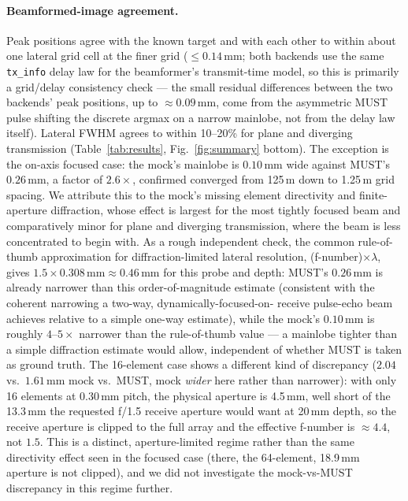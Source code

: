 \documentclass[11pt]{article}
\newcommand{\code}[1]{\texttt{#1}}
\newcommand{\must}{MUST}
\begin{document}
\paragraph{Beamformed-image agreement.} Peak positions agree with the known
target and with each other to within about one lateral grid cell at the
finer grid ($\leq 0.14$\,mm; both backends use the same \code{tx\_info}
delay law for the beamformer's transmit-time model, so this is primarily a
grid/delay consistency check --- the small residual differences between the
two backends' peak positions, up to $\approx 0.09$\,mm, come from the
asymmetric \must{} pulse shifting the discrete argmax on a narrow mainlobe,
not from the delay law itself). Lateral FWHM agrees to within 10--20\% for
plane and diverging transmission (Table~\ref{tab:results},
Fig.~\ref{fig:summary} bottom). The exception is the on-axis focused case:
the mock's mainlobe is $0.10$\,mm wide against \must's $0.26$\,mm, a factor
of $2.6\times$, confirmed converged from 125\,\textmu m down to
1.25\,\textmu m grid spacing. We attribute this to the mock's missing
element directivity and finite-aperture diffraction, whose effect is
largest for the most tightly focused beam and comparatively minor for plane
and diverging transmission, where the beam is less concentrated to begin
with. As a rough independent check, the common rule-of-thumb approximation
for diffraction-limited lateral resolution, (f-number)$\times\lambda$, gives
$1.5 \times 0.308\,\mathrm{mm} \approx 0.46$\,mm for this probe and depth:
\must's $0.26$\,mm is already narrower than this order-of-magnitude estimate
(consistent with the coherent narrowing a two-way, dynamically-focused-on-
receive pulse-echo beam achieves relative to a simple one-way estimate),
while the mock's $0.10$\,mm is roughly $4$--$5\times$ narrower than the
rule-of-thumb value --- a mainlobe tighter than a simple diffraction
estimate would allow, independent of whether \must{} is taken as ground
truth. The 16-element case shows a different kind of discrepancy
($2.04$ vs.\ $1.61$\,mm mock vs.\ \must, mock \emph{wider} here rather than
narrower): with only 16 elements at 0.30\,mm pitch, the physical aperture is
4.5\,mm, well short of the 13.3\,mm the requested f/1.5 receive aperture
would want at 20\,mm depth, so the receive aperture is clipped to the full
array and the effective f-number is $\approx 4.4$, not $1.5$. This is a
distinct, aperture-limited regime rather than the same directivity effect
seen in the focused case (there, the 64-element, 18.9\,mm aperture is not
clipped), and we did not investigate the mock-vs-\must{} discrepancy in this
regime further.
\end{document}
